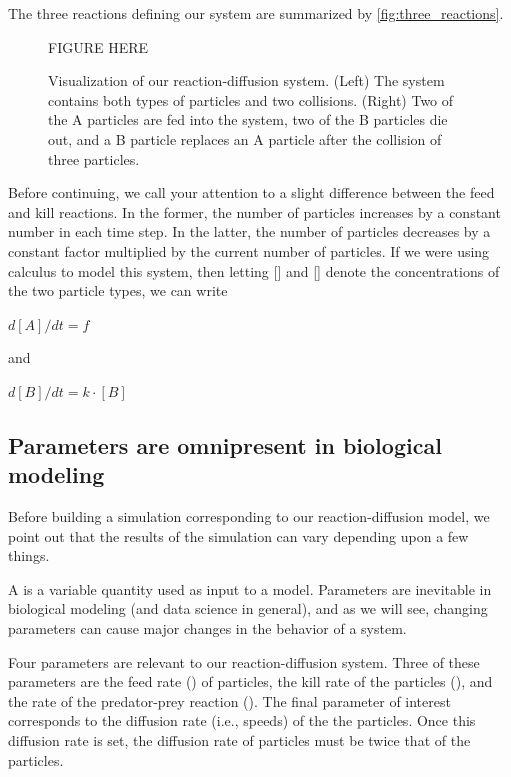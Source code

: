 The three reactions defining our system are summarized by \autoref{fig:three_reactions}.

\begin{figure}[h]
\centering
\mySfFamily
FIGURE HERE
\caption{Visualization of our reaction-diffusion system. (Left) The system contains both types of particles and two collisions. (Right) Two of the A particles are fed into the system, two of the B particles die out, and a B particle replaces an A particle after the collision of three particles.}
\label{fig:three_reactions}
\end{figure}

Before continuing, we call your attention to a slight difference between the feed and kill reactions. In the former, the number of  particles increases by a constant number in each time step. In the latter, the number of  particles decreases by a constant factor multiplied by the current number of  particles. If we were using calculus to model this system, then letting [] and [] denote the concentrations of the two particle types, we can write

\begin{center}
$d[A]/dt = f$
\end{center}

\noindent and

\begin{center}
$d[B]/dt = k \cdot [B]$
\end{center}

\FloatBarrier
{}
\subsection{Parameters are omnipresent in biological modeling}

Before building a simulation corresponding to our reaction-diffusion model, we point out that the results of the simulation can vary depending upon a few things.

A  is a variable quantity used as input to a model. Parameters are inevitable in biological modeling (and data science in general), and as we will see, changing parameters can cause major changes in the behavior of a system.

Four parameters are relevant to our reaction-diffusion system. Three of these parameters are the feed rate () of  particles, the kill rate of the  particles (), and the rate of the predator-prey reaction (). The final parameter of interest corresponds to the diffusion rate (i.e., speeds) of the the  particles. Once this diffusion rate is set, the diffusion rate of  particles must be twice that of the  particles.

